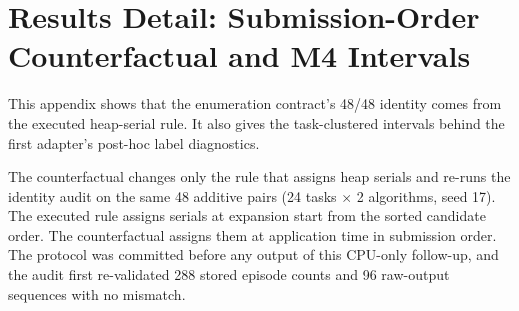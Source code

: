 
\section{Results Detail: Submission-Order Counterfactual and M4 Intervals}
\label{app:results-counterfactual}

This appendix shows that the enumeration contract's 48/48 identity comes from the executed heap-serial rule. It also gives the task-clustered intervals behind the first adapter's post-hoc label diagnostics.

The counterfactual changes only the rule that assigns heap serials and re-runs the identity audit on the same 48 additive pairs (24 tasks $\times$ 2 algorithms, seed 17). The executed rule assigns serials at expansion start from the sorted candidate order. The counterfactual assigns them at application time in submission order. The protocol was committed before any output of this CPU-only follow-up, and the audit first re-validated 288 stored episode counts and 96 raw-output sequences with no mismatch.

